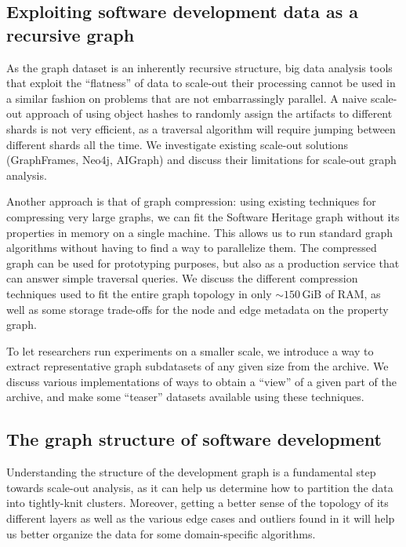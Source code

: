 \subsection*{Exploiting software development data as a recursive graph}

As the graph dataset is an inherently recursive structure, big data analysis
tools that exploit the ``flatness'' of data to scale-out their processing cannot
be used in a similar fashion on problems that are not embarrassingly parallel.
A naive scale-out approach of using object hashes to randomly assign the
artifacts to different shards is not very efficient, as a traversal algorithm
will require jumping between different shards all the time. We investigate
existing scale-out solutions (GraphFrames, Neo4j, AIGraph) and discuss their
limitations for scale-out graph analysis.

Another approach is that of graph compression: using existing techniques for
compressing very large graphs, we can fit the Software Heritage graph without
its properties in memory on a single machine. This allows us to run standard
graph algorithms without having to find a way to parallelize them. The
compressed graph can be used for prototyping purposes, but also as a production
service that can answer simple traversal queries. We discuss the different
compression techniques used to fit the entire graph topology in only
$\sim150$\,GiB of RAM, as well as some storage trade-offs for the node and
edge metadata on the property graph.

To let researchers run experiments on a smaller scale, we introduce a way to
extract representative graph subdatasets of any given size from the archive. We
discuss various implementations of ways to obtain a ``view'' of a given part of
the archive, and make some ``teaser'' datasets available using these techniques.

\subsection*{The graph structure of software development}

Understanding the structure of the development graph is a fundamental step
towards scale-out analysis, as it can help us determine how to partition the
data into tightly-knit clusters. Moreover, getting a better sense of the
topology of its different layers as well as the various edge cases and outliers
found in it will help us better organize the data for some domain-specific
algorithms.

